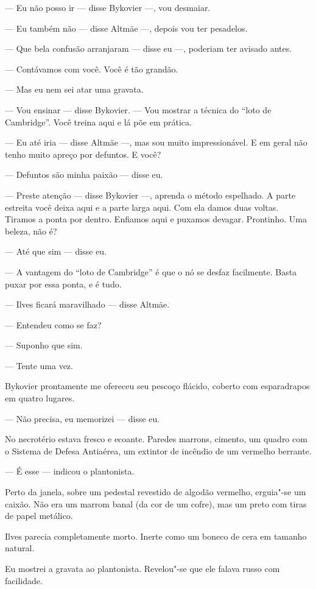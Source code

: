 --- Eu não posso ir --- disse Bykovier ---, vou desmaiar.

--- Eu também não --- disse Altmäe ---, depois vou ter pesadelos.

--- Que bela confusão arranjaram --- disse eu ---, poderiam ter avisado
antes.

--- Contávamos com você. Você é tão grandão.

--- Mas eu nem sei atar uma gravata.

--- Vou ensinar --- disse Bykovier. --- Vou mostrar a técnica do ``loto
de Cambridge''. Você treina aqui e lá põe em prática.

--- Eu até iria --- disse Altmäe ---, mas sou muito impressionável. E em
geral não tenho muito apreço por defuntos. E você?

--- Defuntos são minha paixão --- disse eu.

--- Preste atenção --- disse Bykovier ---, aprenda o método espelhado. A
parte estreita você deixa aqui e a parte larga aqui. Com ela damos duas
voltas. Tiramos a ponta por dentro. Enfiamos aqui e puxamos devagar.
Prontinho. Uma beleza, não é?

--- Até que sim --- disse eu.

--- A vantagem do ``loto de Cambridge'' é que o nó se desfaz facilmente.
Basta puxar por essa ponta, e é tudo.

--- Ilves ficará maravilhado --- disse Altmäe.

--- Entendeu como se faz?

--- Suponho que sim.

--- Tente uma vez.

Bykovier prontamente me ofereceu seu pescoço flácido, coberto com
esparadrapos em quatro lugares.

--- Não precisa, eu memorizei --- disse eu.

No necrotério estava fresco e ecoante. Paredes marrons, cimento, um
quadro com o Sistema de Defesa Antiaérea, um extintor de incêndio de um
vermelho berrante.

--- É esse --- indicou o plantonista.

Perto da janela, sobre um pedestal revestido de algodão vermelho,
erguia"-se um caixão. Não era um marrom banal (da cor de um cofre), mas
um preto com tiras de papel metálico.

Ilves parecia completamente morto. Inerte como um boneco de cera em
tamanho natural.

Eu mostrei a gravata ao plantonista. Revelou"-se que ele falava russo com
facilidade.

